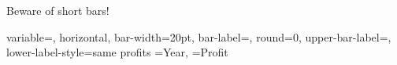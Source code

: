 \documentclass[12pt]{article}
\begin{document}
Beware of short bars! 

\DTLbarchart
{
 variable=\theProfit,
 horizontal,
 bar-width=20pt, 
 bar-label=\theYear,
 round=0,
 upper-bar-label=\DTLbarvalue,
 lower-label-style=same
}
{profits}%
 {%
 \theYear=Year,
 \theProfit=Profit
} 
\end{document}
